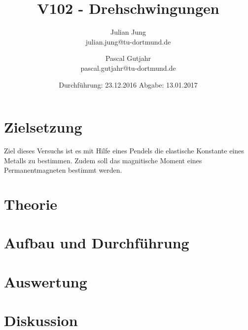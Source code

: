 

\title{V102 - Drehschwingungen}
\author{Julian Jung \\ julian.jung@tu-dortmund.de
  \and Pascal Gutjahr \\ pascal.gutjahr@tu-dortmund.de}
  \date{Durchführung: 23.12.2016
  \hspace{3em}
  Abgabe: 13.01.2017}
  
\maketitle
\newpage
\tableofcontents
\newpage
\section{Zielsetzung}
Ziel dieses Versuchs ist es mit Hilfe eines Pendels die elastische Konstante
eines Metalls zu bestimmen. Zudem soll das magnitische Moment eines
Permanentmagneten bestimmt werden.
\section{Theorie}
\section{Aufbau und Durchführung}
\section{Auswertung}
\section{Diskussion}
\printbibliography

